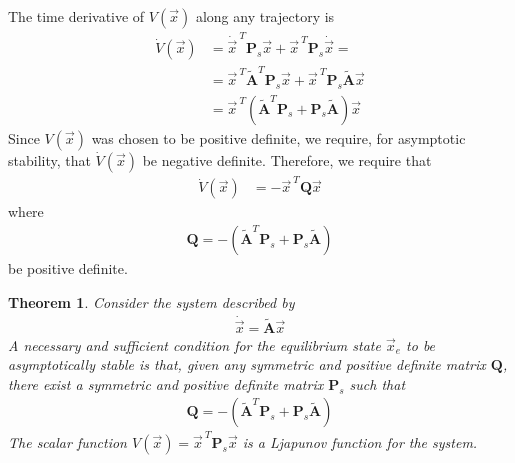 \documentclass[11pt,a4paper,oneside]{book}
\numberwithin{equation}{section}
\theoremstyle{it}
\newtheorem{thm}{Theorem}[chapter]
\theoremstyle{definition}
\begin{document}
The time derivative of $V(\vec{x})$ along any trajectory is
\begin{equation}\label{eqlyap13}
	\begin{aligned}
		\dot{V}(\vec{x}) &= \dot{\vec{x}}^{\ T}\mathbf{P}_s\vec{x}+{\vec{x}}^{\ 
		T}\mathbf{P}_s\dot{\vec{x}} = \\[6pt]
		&= \vec{x}^{\ T} \tilde{\mathbf{A}}^{T} 
		\mathbf{P}_s{\vec{x}}+{\vec{x}}^{\ 
		T}\mathbf{P}_s\tilde{\mathbf{A}}{\vec{x}} \\[6pt]
		& = \vec{x}^{\ T}\left( \tilde{\mathbf{A}}^{T} 
		\mathbf{P}_s+\mathbf{P}_s\tilde{\mathbf{A}}\right) \vec{x}
	\end{aligned}
\end{equation}
Since $V(\vec{x})$ was chosen to be positive definite, we require, for 
asymptotic stability, that $\dot{V}(\vec{x})$ be negative definite. Therefore, 
we require that
\begin{equation}\label{eqlyap14}
	\begin{aligned}
		\dot{V}(\vec{x}) &= -\vec{x}^{\ T}\mathbf{Q} \vec{x}
	\end{aligned}
\end{equation}
where 
\begin{equation}\label{eqlyap15}
	\begin{aligned}
		\mathbf{Q} = -\left( \tilde{\mathbf{A}}^{T} 
		\mathbf{P}_s+\mathbf{P}_s\tilde{\mathbf{A}}\right)
	\end{aligned}
\end{equation}
be positive definite. 
\begin{thm}
	Consider the system described by 
	\begin{equation*}
		\begin{aligned}
			\dot{\vec{x}}=\tilde{\mathbf{A}}\vec{x}
		\end{aligned}
	\end{equation*}
	A necessary and sufficient condition for the equilibrium state $\vec{x}_e$ 
	to be asymptotically stable is that, given any symmetric and positive 
	definite matrix $\mathbf{Q}$, there exist a symmetric and positive definite 
	matrix $\mathbf{P}_s$ such that
	\begin{equation*}
		\begin{aligned}
			\mathbf{Q} = -\left( \tilde{\mathbf{A}}^{T} 
			\mathbf{P}_s+\mathbf{P}_s\tilde{\mathbf{A}}\right)
		\end{aligned}
	\end{equation*}
	The scalar function $V(\vec{x})=\vec{x}^{\ T}\mathbf{P}_s\vec{x}$ is a 
	Ljapunov function for the system.
\end{thm}
\end{document}
